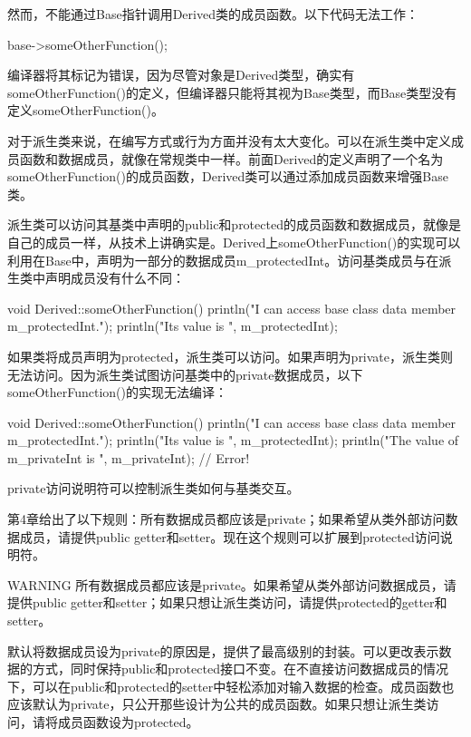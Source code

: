 然而，不能通过Base指针调用Derived类的成员函数。以下代码无法工作：

\begin{cpp}
base->someOtherFunction();
\end{cpp}

编译器将其标记为错误，因为尽管对象是Derived类型，确实有someOtherFunction()的定义，但编译器只能将其视为Base类型，而Base类型没有定义someOtherFunction()。


对于派生类来说，在编写方式或行为方面并没有太大变化。可以在派生类中定义成员函数和数据成员，就像在常规类中一样。前面Derived的定义声明了一个名为someOtherFunction()的成员函数，Derived类可以通过添加成员函数来增强Base类。

派生类可以访问其基类中声明的public和protected的成员函数和数据成员，就像是自己的成员一样，从技术上讲确实是。Derived上someOtherFunction()的实现可以利用在Base中，声明为一部分的数据成员m\_protectedInt。访问基类成员与在派生类中声明成员没有什么不同：

\begin{cpp}
void Derived::someOtherFunction()
{
    println("I can access base class data member m_protectedInt.");
    println("Its value is {}", m_protectedInt);
}
\end{cpp}

如果类将成员声明为protected，派生类可以访问。如果声明为private，派生类则无法访问。因为派生类试图访问基类中的private数据成员，以下someOtherFunction()的实现无法编译：

\begin{cpp}
void Derived::someOtherFunction()
{
    println("I can access base class data member m_protectedInt.");
    println("Its value is {}", m_protectedInt);
    println("The value of m_privateInt is {}", m_privateInt); // Error!
}
\end{cpp}

private访问说明符可以控制派生类如何与基类交互。

第4章给出了以下规则：所有数据成员都应该是private；如果希望从类外部访问数据成员，请提供public getter和setter。现在这个规则可以扩展到protected访问说明符。

\begin{myWarning}{WARNING}
所有数据成员都应该是private。如果希望从类外部访问数据成员，请提供public getter和setter；如果只想让派生类访问，请提供protected的getter和setter。
\end{myWarning}

默认将数据成员设为private的原因是，提供了最高级别的封装。可以更改表示数据的方式，同时保持public和protected接口不变。在不直接访问数据成员的情况下，可以在public和protected的setter中轻松添加对输入数据的检查。成员函数也应该默认为private，只公开那些设计为公共的成员函数。如果只想让派生类访问，请将成员函数设为protected。

